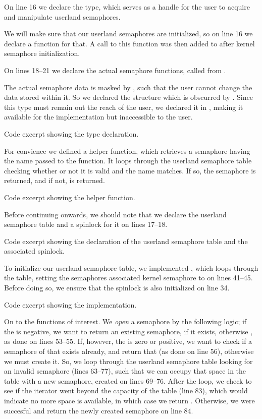 On line 16 we declare the  type, which serves as a handle
for the user to acquire and manipulate userland semaphores.

We will make sure that our userland semaphores are initialized, so on line
16 we declare a function for that. A call to this function was then added to
 after kernel semaphore initialization.

On lines 18--21 we declare the actual semaphore functions, called from
.

The actual semaphore data is masked by , such that the user
cannot change the data stored within it. So we declared the structure
 which is obscurred by . Since this type must
remain out the reach of the user, we declared it in ,
making it available for the implementation but inaccessible to the user.

{Code excerpt showing the  type declaration.}

For convience we defined a helper function, which retrieves a semaphore having
the name passed to the function. It loops through the userland semaphore table
checking whether or not it is valid and the name matches. If so, the semaphore
is returned, and if not,  is returned.

{Code excerpt showing the  helper function.}

Before continuing onwards, we should note that we declare the userland semaphore
table and a spinlock for it on lines 17--18.

{Code excerpt showing the declaration of the userland semaphore table and the
associated spinlock.}

To initialize our userland semaphore table, we implemented
, which loops through the table, setting the
semaphores associated kernel semaphore to  on lines 41--45. Before
doing so, we ensure that the spinlock is also initialized on line 34.

{Code excerpt showing the  implementation.}

On to the functions of interest. We {\it open} a semaphore by the following
logic; if the  is negative, we want to return an existing
semaphore, if it exists, otherwise , as done on lines 53--55. If,
however, the  is zero or positive, we want to check if a semaphore
of that  exists already, and return that (as done on line 56),
otherwise we must create it. So, we loop through the userland semaphore table
looking for an invalid semaphore (lines 63--77), such that we can occupy that
space in the table with a new semaphore, created on lines 69--76. After the
loop, we check to see if the iterator went beyond the capacity of the table
(line 83), which would indicate no more space is available, in which case we
return . Otherwise, we were succesful and return the newly created
semaphore on line 84.

